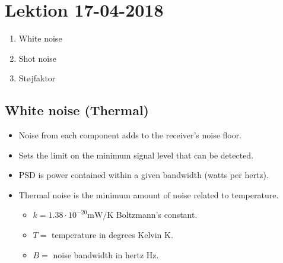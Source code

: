 \section{Lektion 17-04-2018}

\begin{enumerate}
	\item White noise
	\item Shot noise
	\item Støjfaktor
\end{enumerate}

\noindent{} \vspace{3mm}

\subsection{White noise (Thermal)}
\begin{itemize}
	\item Noise from each component adds to the	receiver's noise floor.
	\item Sets the limit on the minimum signal level that can be detected.
	\item PSD is power contained within a	given bandwidth (watts per hertz).
	\item Thermal noise is the minimum amount of noise related to temperature.
	\begin{itemize}
		\item $k=1.38 \cdot 10^{-20}\si{\milli\watt/\kelvin}$ Boltzmann's constant.
		\item $T=$ temperature in degrees Kelvin \si{\kelvin}.
		\item $B=$ noise bandwidth in hertz \si{\hertz}.
	\end{itemize}
\end{itemize}

